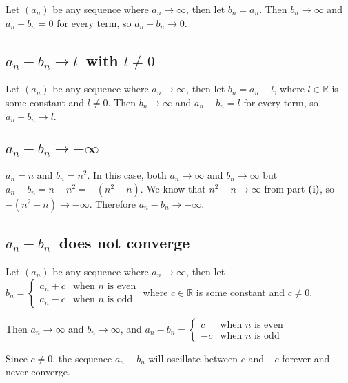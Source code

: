 \documentclass[a4paper]{article}
\begin{document}
Let $(a_n)$ be any sequence where $a_n \to \infty$, then let $b_n = a_n$. Then $b_n \to \infty$ and $a_n - b_n = 0$ for every term, so $a_n - b_n \to 0$.

\subsection{$a_n - b_n \to l$\normalfont\ with $l \ne 0$}

Let $(a_n)$ be any sequence where $a_n \to \infty$, then let $b_n = a_n - l$, where $l \in \mathbb R$ is some constant and $l \ne 0$. Then $b_n \to \infty$ and $a_n - b_n = l$ for every term, so $a_n - b_n \to l$.

\subsection{$a_n - b_n \to -\infty$}

$a_n = n$ and $b_n = n^2$. In this case, both $a_n \to \infty$ and $b_n \to \infty$ but $a_n - b_n = n - n^2 = -(n^2 - n)$. We know that $n^2 - n \to \infty$ from part \textbf{(i)}, so $-(n^2 - n) \to -\infty$. Therefore $a_n - b_n \to -\infty$.

\subsection{$a_n - b_n$\normalfont\ does not converge}

Let $(a_n)$ be any sequence where $a_n \to \infty$, then let $b_n = \begin{cases}
	a_n + c &\text{when } n \text{ is even}\\[1ex]
	a_n - c &\text{when } n \text{ is odd}
\end{cases}$ where $c \in \mathbb R$ is some constant and $c \ne 0$.

Then $a_n \to \infty$ and $b_n \to \infty$, and $a_n - b_n = \begin{cases}
	c  &\text{when } n \text{ is even}\\[1ex]
	-c &\text{when } n \text{ is odd}
\end{cases}$

Since $c \ne 0$, the sequence $a_n - b_n$ will oscillate between $c$ and $-c$ forever and never converge.
\end{document}
